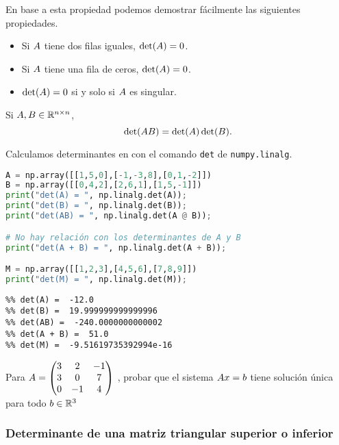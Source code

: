 En base a esta propiedad podemos demostrar f\'acilmente las siguientes propiedades.

\begin{corolario}\leavevmode
\begin{itemize}
\item Si $\Ab$ tiene dos filas iguales, $\det(\Ab)= 0$.
\item Si $\Ab$ tiene una fila de ceros, $\det(\Ab)= 0$.
\item $\det(\Ab) = 0$ si y solo si $\Ab$ es singular.
\end{itemize}
\end{corolario}

\begin{proposicion}
Si $\Ab, \Bb \in \R^{n \times n}$,
$$\det(\Ab \Bb) = \det(\Ab)\det(\Bb).$$
\end{proposicion}

Calculamos determinantes en \python con el comando \texttt{det} de \texttt{numpy.linalg}.
\begin{Shaded}
\begin{lstlisting}[language=python]
A = np.array([[1,5,0],[-1,-3,8],[0,1,-2]])
B = np.array([[0,4,2],[2,6,1],[1,5,-1]])
print("det(A) = ", np.linalg.det(A));
print("det(B) = ", np.linalg.det(B));
print("det(AB) = ", np.linalg.det(A @ B));

# No hay relación con los determinantes de A y B
print("det(A + B) = ", np.linalg.det(A + B));

M = np.array([[1,2,3],[4,5,6],[7,8,9]])
print("det(M) = ", np.linalg.det(M));
\end{lstlisting}
\end{Shaded}

\begin{verbatim}
%% det(A) =  -12.0
%% det(B) =  19.999999999999996
%% det(AB) =  -240.0000000000002
%% det(A + B) =  51.0
%% det(M) =  -9.51619735392994e-16
\end{verbatim}

\begin{ejercicio}
Para $\Ab = \begin{pmatrix} 3 & 2 & -1 \\ 3 & 0 & 7 \\ 0 & -1 & 4 \end{pmatrix}$ , probar que el sistema $\Ab\xb = \bb$ tiene solución única para todo $\bb \in \R^3$
\end{ejercicio}

\subsubsection{Determinante de una matriz triangular superior o inferior}

